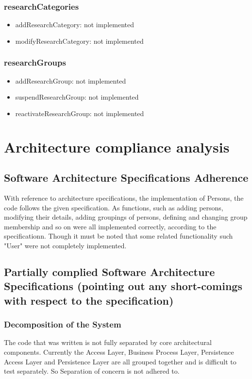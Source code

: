 \documentclass{article}
\begin{document}
\subsubsection{researchCategories}
\begin{itemize}
	\item addResearchCategory: not implemented
	\item modifyResearchCategory: not implemented
\end{itemize}

\subsubsection{researchGroups}
\begin{itemize}
	\item addResearchGroup: not implemented
	\item suspendResearchGroup: not implemented
	\item reactivateResearchGroup: not implemented
\end{itemize}

\newpage

\section{Architecture compliance analysis}
\subsection{Software Architecture Specifications Adherence}
With reference to architecture specifications, the implementation of Persons, the code follows the given specification. As functions, such as adding persons, modifying their details, adding groupings of persons, defining and changing group membership and so on were all implemented correctly, according to the specificationn. Though it must be noted that some related functionality such "User" were not completely implemented.

\subsection{Partially complied Software Architecture Specifications (pointing out any short-comings with respect to the specification)}

\subsubsection{Decomposition of the System}
The code that was written is not fully separated by core architectural components. Currently the Access Layer, Business Process Layer, Persistence Access Layer and Persistence Layer are all grouped together and is difficult to test separately. So Separation of concern is not adhered to.
\end{document}
